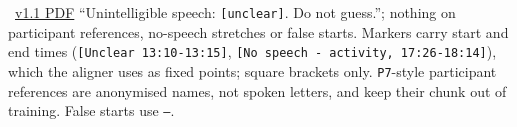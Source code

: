 \documentclass[11pt]{article}
\begin{document}
 { \textperiodcentered\ \href{archive/v1.1/STYLE_GUIDE.pdf}{v1.1 PDF}}
 {``Unintelligible speech: \texttt{[unclear]}. Do not guess.''; nothing on participant references, no-speech stretches or false starts.}
 {Markers carry start and end times (\texttt{[Unclear 13:10-13:15]}, \texttt{[No speech - activity, 17:26-18:14]}), which the aligner uses as fixed points; square brackets only. \texttt{P7}-style participant references are anonymised names, not spoken letters, and keep their chunk out of training. False starts use \texttt{--}.}
\end{document}
